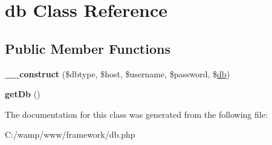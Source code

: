 \hypertarget{classdb}{
\section{db Class Reference}
\label{classdb}
}
\subsection*{Public Member Functions}
\begin{DoxyCompactItemize}
\item 
\hypertarget{classdb_a18ef3f164a3f2fc1bc4016f9578ade08}{
{\bfseries \_\-\_\-construct} (\$dbtype, \$host, \$username, \$password, \$\hyperlink{classdb}{db})}
\label{classdb_a18ef3f164a3f2fc1bc4016f9578ade08}

\item 
\hypertarget{classdb_aceb656ee5135578ab3a9947252caa772}{
{\bfseries getDb} ()}
\label{classdb_aceb656ee5135578ab3a9947252caa772}

\end{DoxyCompactItemize}


The documentation for this class was generated from the following file:\begin{DoxyCompactItemize}
\item 
C:/wamp/www/framework/db.php\end{DoxyCompactItemize}
